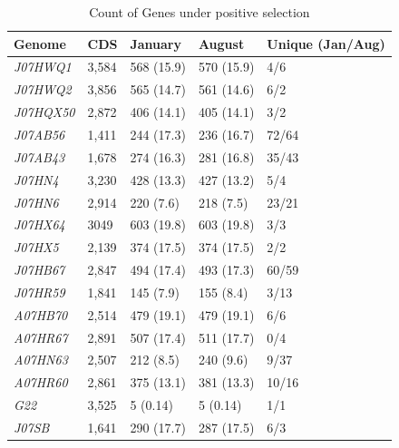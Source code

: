 \begin{table}[hbt]
  \caption{Count of Genes under positive selection}
  \begin{tabularx}{\textwidth}{L{2.2cm}R{2cm}R{3cm}R{3.2cm}R{2cm}}
  \hline
    \textbf{Genome} & \textbf{CDS} & \textbf{January} & \textbf{August} & \textbf{Unique (Jan/Aug)} \\
    \hline
     \textit{J07HWQ1} & 3,584 & 568 (15.9) & 570 (15.9) & 4/6 \\
     \textit{J07HWQ2} & 3,856 & 565 (14.7) & 561 (14.6) & 6/2 \\
     \textit{J07HQX50} & 2,872 & 406 (14.1) & 405 (14.1) & 3/2 \\
     \textit{J07AB56} & 1,411 & 244 (17.3) & 236 (16.7) & 72/64 \\
     \textit{J07AB43} & 1,678 & 274 (16.3) & 281 (16.8) & 35/43 \\
     \textit{J07HN4} & 3,230 & 428 (13.3) & 427 (13.2) & 5/4 \\
     \textit{J07HN6} & 2,914 & 220 (7.6) & 218 (7.5) & 23/21 \\
     \textit{J07HX64} & 3049 & 603 (19.8) & 603 (19.8) & 3/3 \\
     \textit{J07HX5} & 2,139 & 374 (17.5) & 374 (17.5) & 2/2 \\
     \textit{J07HB67} & 2,847 & 494 (17.4) & 493 (17.3) & 60/59 \\
     \textit{J07HR59} & 1,841 & 145 (7.9) & 155 (8.4) & 3/13 \\
     \textit{A07HB70} & 2,514 & 479 (19.1) & 479 (19.1) & 6/6 \\
     \textit{A07HR67} & 2,891 & 507 (17.4) & 511 (17.7) & 0/4 \\
     \textit{A07HN63} & 2,507 & 212 (8.5) & 240 (9.6) & 9/37 \\
     \textit{A07HR60} & 2,861 & 375 (13.1) & 381 (13.3) & 10/16 \\
     \textit{G22} & 3,525 & 5 (0.14) & 5 (0.14) & 1/1 \\
     \textit{J07SB} & 1,641 & 290 (17.7) & 287 (17.5) & 6/3 \\     
  \end{tabularx}
  \label{PSgenes}
\end{table}

